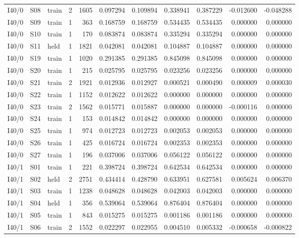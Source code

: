 {\begin{longtable}{@{}lllrrrrrrrr@{}}
I40/0 & S08 & train & 2 & 1605 & 0.097294 & 0.109894 & 0.338941 & 0.387229 & -0.012600 & -0.048288 \\
I40/0 & S09 & train & 1 & 363 & 0.168759 & 0.168759 & 0.534435 & 0.534435 & 0.000000 & 0.000000 \\
I40/0 & S10 & train & 1 & 170 & 0.083874 & 0.083874 & 0.335294 & 0.335294 & 0.000000 & 0.000000 \\
I40/0 & S11 & held & 1 & 1821 & 0.042081 & 0.042081 & 0.104887 & 0.104887 & 0.000000 & 0.000000 \\
I40/0 & S19 & train & 1 & 1020 & 0.291385 & 0.291385 & 0.845098 & 0.845098 & 0.000000 & 0.000000 \\
I40/0 & S20 & train & 1 & 215 & 0.025795 & 0.025795 & 0.023256 & 0.023256 & 0.000000 & 0.000000 \\
I40/0 & S21 & train & 2 & 1921 & 0.012936 & 0.012927 & 0.000521 & 0.000490 & 0.000009 & 0.000030 \\
I40/0 & S22 & train & 1 & 1152 & 0.012622 & 0.012622 & 0.000000 & 0.000000 & 0.000000 & 0.000000 \\
I40/0 & S23 & train & 2 & 1562 & 0.015771 & 0.015887 & 0.000000 & 0.000000 & -0.000116 & 0.000000 \\
I40/0 & S24 & train & 1 & 153 & 0.014842 & 0.014842 & 0.000000 & 0.000000 & 0.000000 & 0.000000 \\
I40/0 & S25 & train & 1 & 974 & 0.012723 & 0.012723 & 0.002053 & 0.002053 & 0.000000 & 0.000000 \\
I40/0 & S26 & train & 1 & 425 & 0.016724 & 0.016724 & 0.002353 & 0.002353 & 0.000000 & 0.000000 \\
I40/0 & S27 & train & 1 & 196 & 0.037006 & 0.037006 & 0.056122 & 0.056122 & 0.000000 & 0.000000 \\
I40/1 & S01 & train & 1 & 221 & 0.398724 & 0.398724 & 0.642534 & 0.642534 & 0.000000 & 0.000000 \\
I40/1 & S02 & held & 2 & 2751 & 0.434414 & 0.428790 & 0.633951 & 0.627581 & 0.005624 & 0.006370 \\
I40/1 & S03 & train & 1 & 1238 & 0.048628 & 0.048628 & 0.042003 & 0.042003 & 0.000000 & 0.000000 \\
I40/1 & S04 & held & 1 & 356 & 0.539064 & 0.539064 & 0.876404 & 0.876404 & 0.000000 & 0.000000 \\
I40/1 & S05 & train & 1 & 843 & 0.015275 & 0.015275 & 0.001186 & 0.001186 & 0.000000 & 0.000000 \\
I40/1 & S06 & train & 2 & 1552 & 0.022297 & 0.022955 & 0.004510 & 0.005332 & -0.000658 & -0.000822 \\

\end{longtable}}
